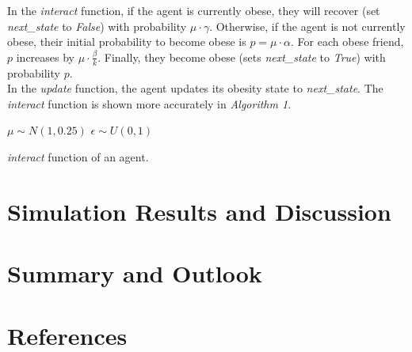 \documentclass[11pt]{article}
\begin{document}
In the \textit{interact} function, if the agent is currently obese, they will recover (set \textit{next\_state} to \textit{False}) with probability \(\mu \cdot \gamma\). 
Otherwise, if the agent is not currently obese, their initial probability to become obese is \(p = \mu \cdot \alpha\). 
For each obese friend, \(p\) increases by \(\mu \cdot \frac{\beta}{k}\). Finally, they become obese (sets \textit{next\_state} to \textit{True}) with probability \(p\). \\

In the \textit{update} function, the agent updates its obesity state to \textit{next\_state}. The \textit{interact} function is shown more accurately in \textit{Algorithm 1}.

\begin{algorithm}[H]

    \(\mu \sim N(1, 0.25)\)\;
    \(\epsilon \sim U(0, 1)\)\;
    \caption{{\textit{interact} function of an agent.} \label{Algorithm}}
\end{algorithm}

\section{Simulation Results and Discussion}

\section{Summary and Outlook}

\section{References}



\end{document}
